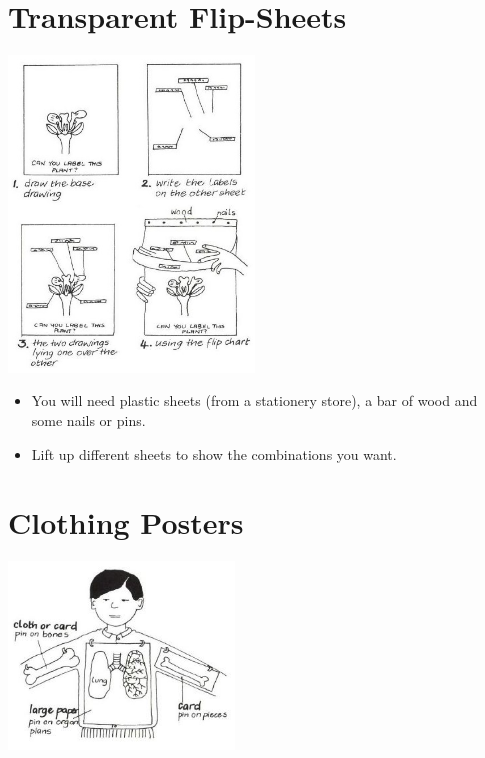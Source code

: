 \begin{multicols}{2}

\section{Transparent Flip-Sheets}

\begin{center}
\includegraphics[width=0.49\textwidth]{./img/vso/transparent-display.jpg}
\end{center}

\begin{itemize}
\item You will need plastic sheets (from a stationery store), a bar of wood and some nails or pins.
\item Lift up different sheets to show the combinations you want.
\end{itemize}

\vfill
\columnbreak


\section{Clothing Posters}

\begin{center}
\includegraphics[width=0.45\textwidth]{./img/vso/clothing-poster.jpg}
\end{center}


\end{multicols}
